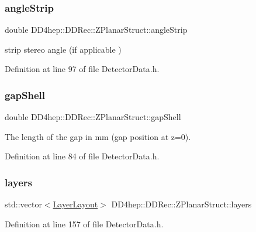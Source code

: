 \subsubsection{\texorpdfstring{angle\+Strip}{angleStrip}}
{\footnotesize\ttfamily double D\+D4hep\+::\+D\+D\+Rec\+::\+Z\+Planar\+Struct\+::angle\+Strip}



strip stereo angle (if applicable ) 



Definition at line 97 of file Detector\+Data.\+h.

\hypertarget{struct_d_d4hep_1_1_d_d_rec_1_1_z_planar_struct_a5136dbae308df17406ebd522459899ca}{}\label{struct_d_d4hep_1_1_d_d_rec_1_1_z_planar_struct_a5136dbae308df17406ebd522459899ca} 
\subsubsection{\texorpdfstring{gap\+Shell}{gapShell}}
{\footnotesize\ttfamily double D\+D4hep\+::\+D\+D\+Rec\+::\+Z\+Planar\+Struct\+::gap\+Shell}



The length of the gap in mm (gap position at z=0). 



Definition at line 84 of file Detector\+Data.\+h.

\hypertarget{struct_d_d4hep_1_1_d_d_rec_1_1_z_planar_struct_ac310bd0aad67cbb00a15226520ca81f9}{}\label{struct_d_d4hep_1_1_d_d_rec_1_1_z_planar_struct_ac310bd0aad67cbb00a15226520ca81f9} 
\subsubsection{\texorpdfstring{layers}{layers}}
{\footnotesize\ttfamily std\+::vector$<$\hyperlink{struct_d_d4hep_1_1_d_d_rec_1_1_z_planar_struct_1_1_layer_layout}{Layer\+Layout}$>$ D\+D4hep\+::\+D\+D\+Rec\+::\+Z\+Planar\+Struct\+::layers}



Definition at line 157 of file Detector\+Data.\+h.

